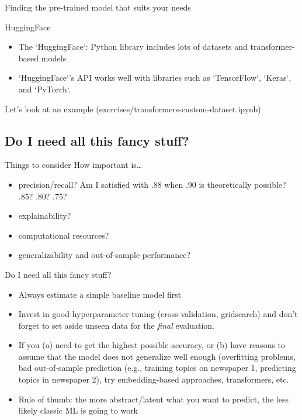 \documentclass[compress]{beamer}
\begin{document}
\begin{frame}{Finding the pre-trained model that suits your needs}
	\begin{block}{HuggingFace}
		\begin{itemize}[<+->]
			\item The `HuggingFace`: Python library includes lots of datasets and transformer-based models 
			\item `HuggingFace`'s API works well with libraries such as `TensorFlow`, `Keras`, and `PyTorch`. 
		\end{itemize}
	\end{block}
\end{frame}

\begin{frame}[standout]
	Let's look at an example (exercises/transformers-custom-dataset.ipynb)
\end{frame}

\subsection{Do I need all this fancy stuff?}

\begin{frame}{Things to consider}
	How important is\ldots
	\begin{itemize}[<+->]
		\item precision/recall? Am I satisfied with .88 when .90 is theoretically possible? .85? .80? .75?
		\item explainability?
		\item computational resources?
		\item generalizability and out-of-sample performance?
	\end{itemize}
\end{frame}

\begin{frame}{Do I need all this fancy stuff?}
	\begin{itemize}[<+->]
		\item Always estimate a simple baseline model first
		\item Invest in good hyperparameter-tuning (cross-validation, gridsearch) and don't forget to set aside unseen data for the \emph{final} evaluation.
		\item If you (a) need to get the highest possible accuracy, or (b) have reasons to assume that the model does not generalize well enough (overfitting problems, bad out-of-sample prediction (e.g., training topics on newspaper 1, predicting topics in newspaper 2), try embedding-based approaches, transformers, etc.
		\item Rule of thumb: the more abstract/latent what you want to predict, the less likely classic ML is going to work
	\end{itemize}
\end{frame}
\end{document}
